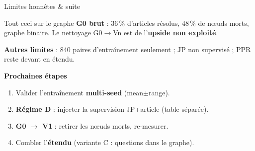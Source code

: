 \documentclass[aspectratio=169,10pt]{beamer}
\newcommand{\warnbox}[1]{\begin{center}\colorbox{red!10}{\parbox{0.92\linewidth}{\centering #1}}\end{center}}
\begin{document}
\begin{frame}{Limites honnêtes \& suite}
  \warnbox{Tout ceci sur le graphe \textbf{G0 brut} : 36\,\% d'articles résolus, 48\,\% de nœuds morts, graphe binaire. Le nettoyage G0$\to$Vn est de l'\textbf{upside non exploité}.}

  \vspace{0.3em}
  \textbf{Autres limites} : 840 paires d'entraînement seulement ; JP non supervisé ; PPR reste devant en étendu.

  \vspace{0.5em}
  \textbf{Prochaines étapes}
  \begin{enumerate}
    \item Valider l'entraînement \textbf{multi-seed} (mean$\pm$range).
    \item \textbf{Régime D} : injecter la supervision JP+article (table séparée).
    \item \textbf{G0 $\to$ V1} : retirer les nœuds morts, re-mesurer.
    \item Combler l'\textbf{étendu} (variante C : questions dans le graphe).
  \end{enumerate}
\end{frame}
\end{document}
